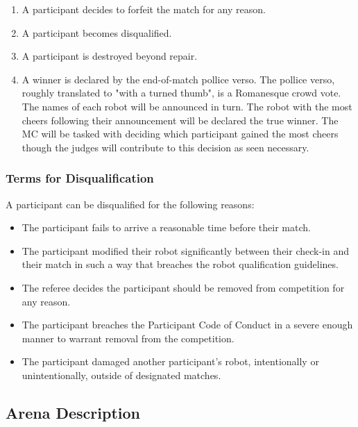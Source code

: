 \documentclass{article}
\begin{document}
			\begin{enumerate}
                          \item A participant decides to forfeit the match for any reason.
                          \item A participant becomes disqualified.
                          \item A participant is destroyed beyond repair.
                          \item A winner is declared by the end-of-match pollice verso. The pollice verso, roughly translated to
"with a turned thumb", is a Romanesque crowd vote. The names of each robot will be announced in turn. The robot with the most cheers following their announcement will be declared the true winner. The MC will be tasked with deciding which participant gained the most cheers though the judges will contribute to this decision as seen necessary.

                        \end{enumerate}


		\subsubsection {Terms for Disqualification}	
				A participant can be disqualified for the following reasons:
				
				
	\begin{itemize}
  			\item The participant fails to arrive a reasonable time before their match.
 			\item The participant modified their robot significantly between their check-in and their match in such a way that breaches the robot qualification guidelines.
  			\item The referee decides the participant should be removed from competition for any reason.
 			\item The participant breaches the Participant Code of Conduct in a severe enough manner to warrant
removal from the competition.
  			\item The participant damaged another participant's robot, intentionally or unintentionally, outside of
designated matches.
		\end{itemize}





	\subsection {Arena Description}	
            		
\end{document}
